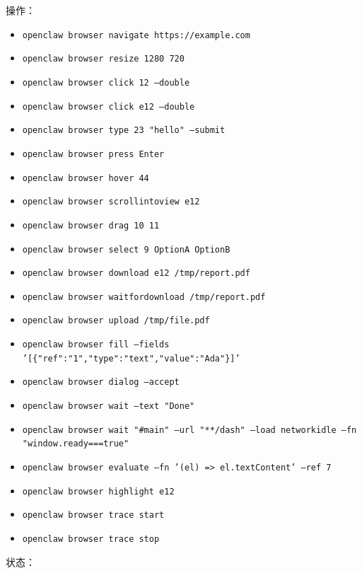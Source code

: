 操作：

\begin{itemize}
  \item \texttt{openclaw browser navigate https://example.com}
  \item \texttt{openclaw browser resize 1280 720}
  \item \texttt{openclaw browser click 12 --double}
  \item \texttt{openclaw browser click e12 --double}
  \item \texttt{openclaw browser type 23 "hello" --submit}
  \item \texttt{openclaw browser press Enter}
  \item \texttt{openclaw browser hover 44}
  \item \texttt{openclaw browser scrollintoview e12}
  \item \texttt{openclaw browser drag 10 11}
  \item \texttt{openclaw browser select 9 OptionA OptionB}
  \item \texttt{openclaw browser download e12 /tmp/report.pdf}
  \item \texttt{openclaw browser waitfordownload /tmp/report.pdf}
  \item \texttt{openclaw browser upload /tmp/file.pdf}
  \item \texttt{openclaw browser fill --fields '[\{"ref":"1","type":"text","value":"Ada"\}]'}
  \item \texttt{openclaw browser dialog --accept}
  \item \texttt{openclaw browser wait --text "Done"}
  \item \texttt{openclaw browser wait "\#main" --url "**/dash" --load networkidle --fn "window.ready===true"}
  \item \texttt{openclaw browser evaluate --fn '(el) => el.textContent' --ref 7}
  \item \texttt{openclaw browser highlight e12}
  \item \texttt{openclaw browser trace start}
  \item \texttt{openclaw browser trace stop}
\end{itemize}


状态：

